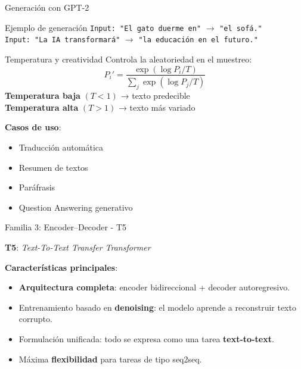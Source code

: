 \begin{frame}{Generación con GPT-2}

\begin{block}{Ejemplo de generación}
\small
\texttt{Input: "El gato duerme en"} $\rightarrow$ \texttt{"el sofá."}\\[0.3em]
\texttt{Input: "La IA transformará"} $\rightarrow$ \texttt{"la educación en el futuro."}
\end{block}

\vspace{0.4em}

\begin{block}{Temperatura y creatividad}
\small
Controla la aleatoriedad en el muestreo:\\
\[
P_i' = \frac{\exp(\log P_i / T)}{\sum_j \exp(\log P_j / T)}
\]
\textbf{Temperatura baja} $(T<1)$ → texto predecible\\
\textbf{Temperatura alta} $(T>1)$ → texto más variado
\end{block}
\textbf{Casos de uso}:
\begin{itemize}
    \item Traducción automática
    \item Resumen de textos
    \item Paráfrasis
    \item Question Answering generativo
\end{itemize}

\end{frame}




\begin{frame}{Familia 3: Encoder–Decoder - T5}

\textbf{T5}: \textit{Text-To-Text Transfer Transformer}

\textbf{Características principales}:
\begin{itemize}
    \item \textbf{Arquitectura completa}: encoder bidireccional + decoder autoregresivo.
    \item Entrenamiento basado en \textbf{denoising}: el modelo aprende a reconstruir texto corrupto.
    \item Formulación unificada: todo se expresa como una tarea \textbf{text-to-text}.
    \item Máxima \textbf{flexibilidad} para tareas de tipo seq2seq.
\end{itemize}

\end{frame}



